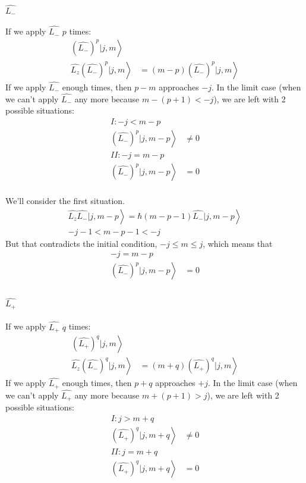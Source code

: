 		\paragraph{$\hat{L_-}$}
			If we apply $\hat{L_-}$ $p$ times:
			\begin{align}
				\left. \left(\hat{L_-}\right)^p | j,m \right\rangle &\\
				\left. \hat{L_z}\left(\hat{L_-}\right)^p | j,m \right\rangle &= \left. (m-p)\left(\hat{L_-}\right)^p | j,m \right\rangle
			\end{align}
			If we apply $\hat{L_-}$ enough times, then $p-m$ approaches $-j$. In the limit case (when we can't apply  $\hat{L_-}$ any more because $m-(p+1) < -j$), we are left with 2 possible situations:
			\begin{align}
				I: -j < m - p&\\
				\left. \left(\hat{L_-}\right)^p | j,m-p \right\rangle &\neq 0 \\
				II: -j = m - p&\\
				\left. \left(\hat{L_-}\right)^p | j,m-p \right\rangle &= 0 \\
			\end{align}
			
			We'll consider the first situation.
			\begin{align}
				\left. \hat{L_z}\hat{L_-} | j,m-p \right\rangle	 = \left. \hbar(m-p-1) \hat{L_-}| j,m-p \right\rangle \\
				-j -1 < m-p-1 < -j
			\end{align}
			But that contradicts the initial condition, $-j \leq m \leq j$, which means that
			\begin{align}
				-j = m - p& \\ 
				\left. \left(\hat{L_-}\right)^p | j,m-p \right\rangle &= 0 \\
			\end{align}
		\paragraph{$\hat{L_+}$}
			If we apply $\hat{L_+}$ $q$ times:
			\begin{align}
				\left. \left(\hat{L_+}\right)^q | j,m \right\rangle &\\
				\left. \hat{L_z}\left(\hat{L_-}\right)^q | j,m \right\rangle &= \left. (m+q)\left(\hat{L_+}\right)^q | j,m \right\rangle
			\end{align}
			If we apply $\hat{L_+}$ enough times, then $p+q$ approaches $+j$. In the limit case (when we can't apply  $\hat{L_+}$ any more because $m+(p+1) > j$), we are left with 2 possible situations:
			\begin{align}
				I: j > m + q&\\
				\left. \left(\hat{L_+}\right)^q | j,m+q \right\rangle &\neq 0 \\
				II: j = m + q &\\
				\left. \left(\hat{L_+}\right)^q | j,m+q \right\rangle &= 0 \\
			\end{align}
			

